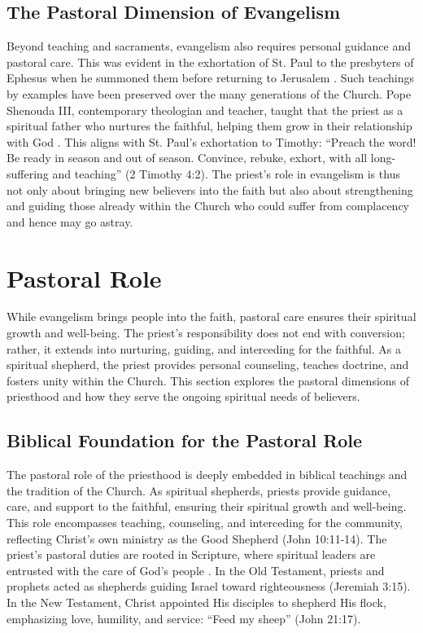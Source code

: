 \documentclass[12pt,doc]{apa7}   	%
\begin{document}
\subsection{The Pastoral Dimension of Evangelism}

Beyond teaching and sacraments, evangelism also requires personal guidance and pastoral care.  This was evident in the exhortation of St. Paul to the presbyters of Ephesus when he summoned them before returning to Jerusalem \citep{paul_wright}.  Such teachings by examples have been preserved over the many generations of the Church. Pope Shenouda III, contemporary theologian and teacher, taught that the priest as a spiritual father who nurtures the faithful, helping them grow in their relationship with God \citep{priesthood_shenouda}. This aligns with St. Paul’s exhortation to Timothy: “Preach the word! Be ready in season and out of season. Convince, rebuke, exhort, with all long-suffering and teaching” (2 Timothy 4:2). The priest’s role in evangelism is thus not only about bringing new believers into the faith but also about strengthening and guiding those already within the Church who could suffer from complacency and hence may go astray.


\section{Pastoral Role}\label{pastoral}
While evangelism brings people into the faith, pastoral care ensures their spiritual growth and well-being. The priest’s responsibility does not end with conversion; rather, it extends into nurturing, guiding, and interceding for the faithful. As a spiritual shepherd, the priest provides personal counseling, teaches doctrine, and fosters unity within the Church. This section explores the pastoral dimensions of priesthood and how they serve the ongoing spiritual needs of believers.

\subsection{Biblical Foundation for the Pastoral Role}
The pastoral role of the priesthood is deeply embedded in biblical teachings and the tradition of the Church. As spiritual shepherds, priests provide guidance, care, and support to the faithful, ensuring their spiritual growth and well-being. This role encompasses teaching, counseling, and interceding for the community, reflecting Christ’s own ministry as the Good Shepherd (John 10:11-14).  The priest’s pastoral duties are rooted in Scripture, where spiritual leaders are entrusted with the care of God’s people \citep{complete_work_chrysostom}. In the Old Testament, priests and prophets acted as shepherds guiding Israel toward righteousness (Jeremiah 3:15). In the New Testament, Christ appointed His disciples to shepherd His flock, emphasizing love, humility, and service: ``Feed my sheep'' (John 21:17).
\end{document}
